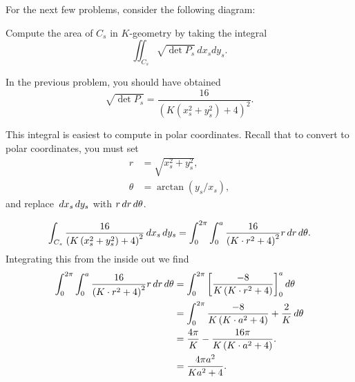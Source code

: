 \documentclass[newpage,hints,12pt,noauthor,nooutcomes,handout]{ximera}
\begin{document}
For the next few problems, consider the following diagram:
\begin{center}
\end{center}


\begin{problem}
  Compute the area of $C_s$ in $K$-geometry by taking the integral
  \[\iint_{C_s} \sqrt{\det P_s}\, dx_sdy_s.\]
  \begin{hint}
    In the previous problem, you should have obtained
    \[\sqrt{\det P_s}=\frac{16}{(K(x_s^2+y_s^2)+4)^2}.\]
  \end{hint}
  \begin{hint}
    This integral is easiest to compute in polar coordinates.  Recall that to
    convert to polar coordinates, you must set
    \begin{align*}
      r &= \sqrt{x_s^2+y_s^2},\\
      \theta &= \arctan(y_s/x_s),
    \end{align*}
    and replace $\,d x_s\,d y_s$ with $r\,d r\,d \theta$.
  \end{hint}
  \begin{freeResponse}
    \[
    \int_{C_s} \frac{16}{\left(K\left(x_s^2+y_s^2\right)+4\right)^2} \,d x_s\,d y_s
    =\int_0^{2\pi}\int_0^a \frac{16}{\left(K\cdot r^2+4\right)^2} r\,d r \,d \theta.
    \]
    Integrating this from the inside out we find
    \begin{align*}
      \int_0^{2\pi} \int_0^a \frac{16}{\left(K\cdot r^2+4\right)^2} r\,d r \,d \theta
      &= \int_0^{2\pi} \bigg[ \frac{-8}{K\left(K\cdot r^2+4\right)} \bigg]_0^a \,d \theta\\
      &= \int_0^{2\pi} \frac{-8}{K\left(K\cdot a^2+4\right)}+\frac{2}{K} \,d \theta\\
      &= \frac{4\pi}{K}-\frac{16\pi}{K\left(K\cdot a^2+4\right)}. \\
      &= \frac{4\pi a^2}{Ka^2+4}.
    \end{align*}
  \end{freeResponse}
\end{problem}
\end{document}
